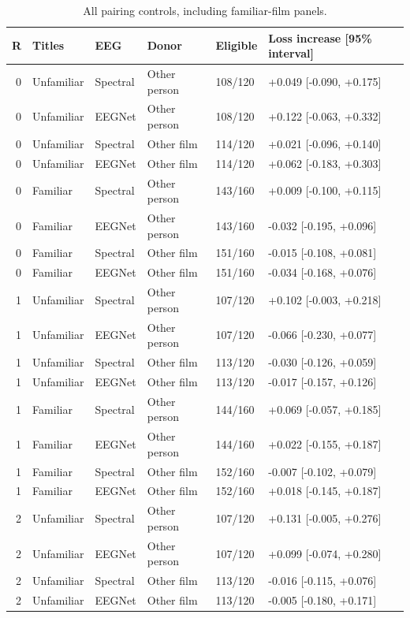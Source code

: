 \begin{table}[tbp]
\centering
\small
\caption{All pairing controls, including familiar-film panels.}
\label{tab:allpairing}
\begin{tabular}{rlllll}
\toprule
R & Titles & EEG & Donor & Eligible & Loss increase [95\% interval] \\
\midrule
0 & Unfamiliar & Spectral & Other person & 108/120 & +0.049 [-0.090, +0.175] \\
0 & Unfamiliar & EEGNet & Other person & 108/120 & +0.122 [-0.063, +0.332] \\
0 & Unfamiliar & Spectral & Other film & 114/120 & +0.021 [-0.096, +0.140] \\
0 & Unfamiliar & EEGNet & Other film & 114/120 & +0.062 [-0.183, +0.303] \\
0 & Familiar & Spectral & Other person & 143/160 & +0.009 [-0.100, +0.115] \\
0 & Familiar & EEGNet & Other person & 143/160 & -0.032 [-0.195, +0.096] \\
0 & Familiar & Spectral & Other film & 151/160 & -0.015 [-0.108, +0.081] \\
0 & Familiar & EEGNet & Other film & 151/160 & -0.034 [-0.168, +0.076] \\
1 & Unfamiliar & Spectral & Other person & 107/120 & +0.102 [-0.003, +0.218] \\
1 & Unfamiliar & EEGNet & Other person & 107/120 & -0.066 [-0.230, +0.077] \\
1 & Unfamiliar & Spectral & Other film & 113/120 & -0.030 [-0.126, +0.059] \\
1 & Unfamiliar & EEGNet & Other film & 113/120 & -0.017 [-0.157, +0.126] \\
1 & Familiar & Spectral & Other person & 144/160 & +0.069 [-0.057, +0.185] \\
1 & Familiar & EEGNet & Other person & 144/160 & +0.022 [-0.155, +0.187] \\
1 & Familiar & Spectral & Other film & 152/160 & -0.007 [-0.102, +0.079] \\
1 & Familiar & EEGNet & Other film & 152/160 & +0.018 [-0.145, +0.187] \\
2 & Unfamiliar & Spectral & Other person & 107/120 & +0.131 [-0.005, +0.276] \\
2 & Unfamiliar & EEGNet & Other person & 107/120 & +0.099 [-0.074, +0.280] \\
2 & Unfamiliar & Spectral & Other film & 113/120 & -0.016 [-0.115, +0.076] \\
2 & Unfamiliar & EEGNet & Other film & 113/120 & -0.005 [-0.180, +0.171] \\

\end{tabular}
\end{table}

